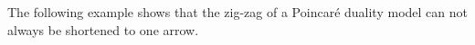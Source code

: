 \documentclass[\MainFolder/Text.tex]{subfiles}
\begin{document}

The following example shows that the zig-zag of a Poincar\'e duality model can not always be shortened to one arrow.
\end{document}
